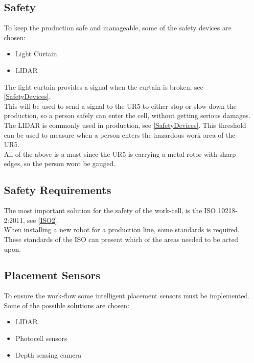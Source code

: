 \subsection{Safety}

To keep the production safe and manageable, some of the safety devices are chosen:

\begin{itemize}
    \item Light Curtain
    \item LIDAR
\end{itemize}

The light curtain provides a signal when the curtain is broken, see \ref{SafetyDevices}.\\
This will be used to send a signal to the UR5 to either stop or slow down the production, so a person safely can enter the cell, without getting serious damages.\\

The LIDAR is commonly used in production, see \ref{SafetyDevices}.
This threshold can be used to measure when a person enters the hazardous work area of the UR5.\\
All of the above is a must since the UR5 is carrying a metal rotor with sharp edges, so the person wont be gauged.\\

\subsection{Safety Requirements}

The most important solution for the safety of the work-cell, is the ISO 10218-2:2011, see \ref{ISO2}.\\
When installing a new robot for a production line, some standards is required. These standards of the ISO can present which of the areas needed to be acted upon.\\

\subsection{Placement Sensors}

To ensure the work-flow some intelligent placement sensors must be implemented. Some of the possible solutions are chosen:\\

\begin{itemize}
    \item LIDAR
    \item Photocell sensors
    \item Depth sensing camera
\end{itemize}


